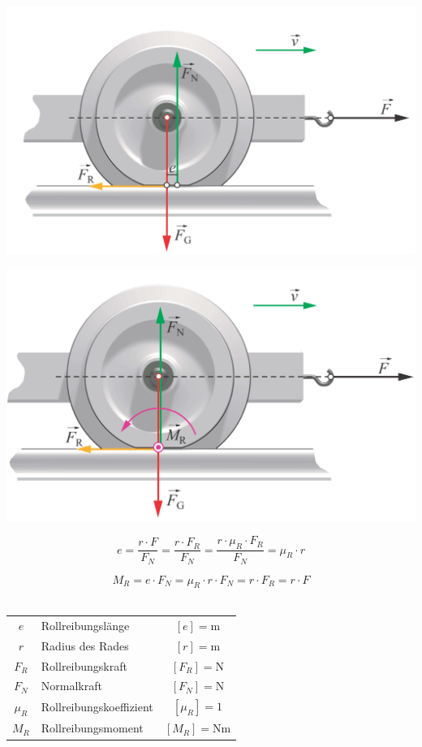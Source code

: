 	 \begin{minipage}{0.48\linewidth}
	 
	\includegraphics[width=0.8\linewidth]{Bilder/rollreibung_1} \\
	 \end{minipage}
	 \hfill
	 \begin{minipage}{0.48\linewidth}
	 
	\includegraphics[width=0.8\linewidth]{Bilder/rollreibung_2} \\
	 \end{minipage}
	
	$$ \boxed{ e = \frac{r \cdot F}{F_N} = \frac{r \cdot F_R}{F_N} =  \frac{r \cdot \mu_R \cdot F_R}{F_N} = \mu_R \cdot r }$$ 
	
	$$ \boxed{ M_R = e \cdot F_N = \mu_R \cdot r \cdot F_N = r \cdot F_R = r \cdot F} $$ \\
	
	
	\begin{tabular}{c l c}
	$e$ & Rollreibungslänge & $[e] = \mathrm{m}$ \\
	$r$ & Radius des Rades & $[r] = \mathrm{m}$ \\
	$F_R$ & Rollreibungskraft & $[F_R] = \mathrm{N}$ \\
	$F_N$ & Normalkraft & $[F_N] = \mathrm{N}$ \\
	$\mu_R$ & Rollreibungskoeffizient & $[\mu_R] = 1$ \\
	$M_R$ & Rollreibungsmoment & $[M_R] = \mathrm{Nm}$ \\
	\end{tabular}
	

